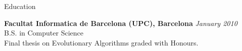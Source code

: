 \documentclass{resume} %
\begin{document}

\begin{rSection}{Education}

{\bf Facultat Informatica de Barcelona (UPC), Barcelona} \hfill {\em January 2010} \\
B.S. in Computer Science \\
Final thesis on Evolutionary Algorithms graded with Honours. \smallskip \\
\end{rSection}

\end{document}
